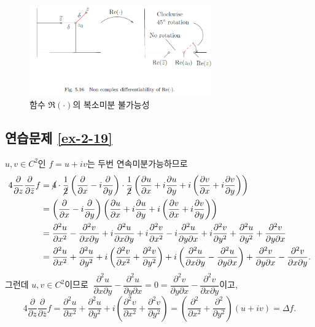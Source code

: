 \begin{figure}[h!]
\begin{center}
\includegraphics[width=0.7\textwidth]{./figs/fig-5-16}
\end{center}
\caption{함수 $\Re(\cdot)$의 복소미분 불가능성}
\label{fig-5-16}
\end{figure}

\subsection*{연습문제 \ref{ex-2-19}}

$u,v\in C^2$인 $f=u+iv$는 두번 연속미분가능하므로
\begin{align*}
4\dfrac\partial{\partial z}\dfrac\partial{\partial \bar z}f
&= \cancel{4}\cdot \dfrac1{\cancel{2}} \left(\dfrac\partial{\partial x} - i \dfrac\partial{\partial y} \right)
\cdot\dfrac1{\cancel{2}} \left( \dfrac{\partial u}{\partial x} + i \dfrac{\partial u}{\partial y}
+ i \left( \dfrac{\partial v}{\partial x} + i \dfrac{\partial v}{\partial y} \right) \right) \\
&=\left(\dfrac\partial{\partial x} - i \dfrac\partial{\partial y} \right)
\left( \dfrac{\partial u}{\partial x} + i \dfrac{\partial u}{\partial y}
+ i \left( \dfrac{\partial v}{\partial x} + i \dfrac{\partial v}{\partial y} \right) \right) \\
&= \dfrac{\partial^2 u}{\partial x^2} - \dfrac{\partial^2 v}{\partial x \partial y}
+ i \dfrac{\partial^2 u}{\partial x \partial y} + i\dfrac{\partial^2 v}{\partial x^2}
- i \dfrac{\partial^2 u}{\partial y \partial x} + i \dfrac{\partial^2 v}{\partial y^2}
+ \dfrac{\partial^2 u}{\partial y^2}  + \dfrac{\partial^2 v}{\partial y\partial x}  \\
&= \dfrac{\partial^2 u}{\partial x^2} + \dfrac{\partial^2 u}{\partial y^2} 
+ i\left( \dfrac{\partial^2 v}{\partial x^2} + \dfrac{\partial^2 v}{\partial y^2} \right)
+ i\left( \dfrac{\partial^2 u}{\partial x\partial y} - \dfrac{\partial^2 u}{\partial y\partial x} \right)
+ \dfrac{\partial^2 v}{\partial y\partial x}  - \dfrac{\partial^2 v}{\partial x\partial y} .
\end{align*}
그런데 $u,v\in C^2$이므로
$\ \dfrac{\partial^2 u}{\partial x\partial y} - \dfrac{\partial^2 u}{\partial y\partial x} = 0
= \dfrac{\partial^2 v}{\partial y\partial x} - \dfrac{\partial^2 v}{\partial x\partial y}$이고,
\[
4\dfrac\partial{\partial z}\dfrac\partial{\partial \bar z}f
= \dfrac{\partial^2 u}{\partial x^2} + \dfrac{\partial^2 u}{\partial y^2} 
+ i \left( \dfrac{\partial^2 v}{\partial x^2} + \dfrac{\partial^2 v}{\partial y^2} \right)
= \left( \dfrac{\partial^2}{\partial x^2} + \dfrac{\partial^2}{\partial y^2} \right)(u+iv)
= \Delta f.
\]




%


